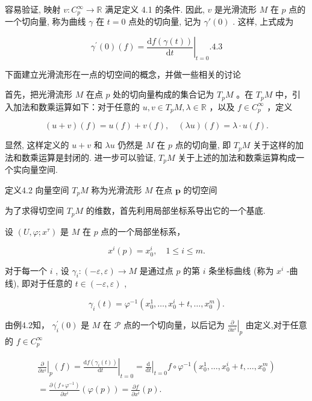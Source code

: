 容易验证, 映射  $v: C_p^\infty \to \mathbb{R}$  满足定义 4.1 的条件. 因此,  $v$  是光滑流形  $M$  在  $p$  点的一个切向量, 称为曲线  $\gamma$  在  $t = 0$  点处的切向量, 记为  $\gamma'(0)$ . 这样, 上式成为

$$
\gamma^ {\prime} (0) (f) = \left. \frac {\mathrm {d} f (\gamma (t))}{\mathrm {d} t} \right| _ {t = 0}. %
 {4.3}
$$

下面建立光滑流形在一点的切空间的概念，并做一些相关的讨论

首先，把光滑流形  $M$  在点  $p$  处的切向量构成的集合记为  $T_{p}M$ 。在  $T_{p}M$  中，引入加法和数乘运算如下：对于任意的  $u, v \in T_{p}M, \lambda \in \mathbb{R}$ ，以及  $f \in C_{p}^{\infty}$ ，定义

$$
(u + v) (f) = u (f) + v (f), \quad (\lambda u) (f) = \lambda \cdot u (f).
$$

显然, 这样定义的  $u + v$  和  $\lambda u$  仍然是  $M$  在  $p$  点的切向量, 即  $T_{p}M$  关于这样的加法和数乘运算是封闭的. 进一步可以验证,  $T_{p}M$  关于上述的加法和数乘运算构成一个实向量空间.

定义4.2 向量空间  $T_{p}M$  称为光滑流形  $M$  在点  $\pmb{p}$  的切空间

为了求得切空间  $T_{p}M$  的维数，首先利用局部坐标系导出它的一个基底.

设  $(U, \varphi; x^{\tau})$  是  $M$  在  $p$  点的一个局部坐标系，

$$
x ^ {i} (p) = x _ {0} ^ {i}, \quad 1 \leqslant i \leqslant m.
$$

对于每一个  $i$ , 设  $\gamma_i: (-\varepsilon, \varepsilon) \to M$  是通过点  $p$  的第  $i$  条坐标曲线 (称为  $x^i$ -曲线), 即对于任意的  $t \in (-\varepsilon, \varepsilon)$ ,

$$
\gamma_ {i} (t) = \varphi^ {- 1} \left(x _ {0} ^ {1}, \dots , x _ {0} ^ {i} + t, \dots , x _ {0} ^ {m}\right).
$$

由例4.2知，  $\gamma_i^{\prime}(0)$  是  $M$  在  $\mathcal{P}$  点的一个切向量，以后记为  $\left.\frac{\partial}{\partial x^i}\right|_p$  由定义,对于任意的  $f\in C_p^\infty$

$$
\begin{array}{l} \left. \frac {\partial}{\partial x ^ {i}} \right| _ {p} (f) = \left. \frac {\mathrm {d} f \left(\gamma_ {i} (t)\right)}{\mathrm {d} t} \right| _ {t = 0} = \left. \frac {\mathrm {d}}{\mathrm {d} t} \right| _ {t = 0} f \circ \varphi^ {- 1} \left(x _ {0} ^ {1}, \dots , x _ {0} ^ {i} + t, \dots , x _ {0} ^ {m}\right) \\ = \frac {\partial \left(f \circ \varphi^ {- 1}\right)}{\partial x ^ {i}} (\varphi (p)) = \frac {\partial f}{\partial x ^ {i}} (p). %
\\ \end{array}
$$

